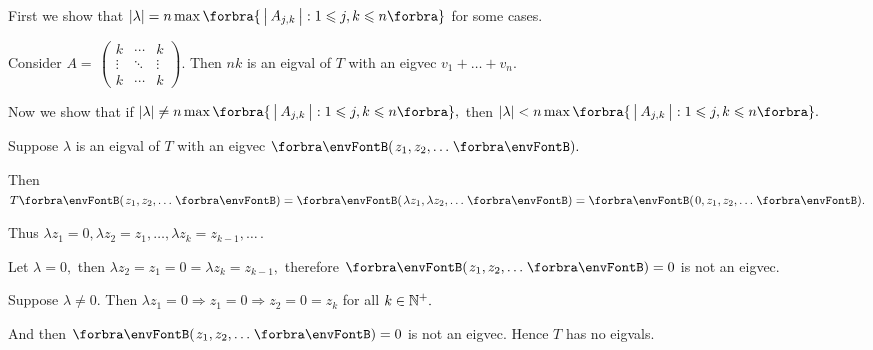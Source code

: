 \documentclass[a4paper, 11pt, UTF8]{article}
\begin{document}
\begin{large}
\par\quad
First we show that $\left|\lambda\right|=n\max\Bra{\Mid{A_{j,k}}:1\leqslant j, k\leqslant n}$ for some cases.\par\quad
Consider $A=\,${\small$\begin{pmatrix}
k & \cdots & k\\
\vdots & \ddots & \vdots\\
k & \cdots & k
\end{pmatrix}.$} Then $nk$ is an eigval of $T$ with an eigvec $v_1+\dots+v_n.$\par\quad
Now we show that if $\left|\lambda\right|\neq n\max\Bra{\Mid{A_{j,k}}:1\leqslant j, k\leqslant n},$ then $\left|\lambda\right|<n\max\Bra{\Mid{A_{j,k}}:1\leqslant j, k\leqslant n}.$\par\quad
\par
\SepLine

\par\quad
Suppose $\lambda$ is an eigval of $T$ with an eigvec $\Par{z_1,z_2,\dots}.$\par\quad
Then $T\Par{z_1,z_2,\dots}=\Par{\lambda z_1,\lambda z_2,\dots}=\Par{0,z_1,z_2,\dots}.$\par\quad
Thus $\lambda z_1=0,\lambda z_2=z_1,\dots,\lambda z_k=z_{k-1},\dots$\,.\par\quad
Let $\lambda=0,$ then $\lambda z_2=z_1=0=\lambda z_k=z_{k-1},$ therefore $\Par{z_1,z_2,\dots}=0$ is not an eigvec.\par\quad
Suppose $\lambda\neq 0$. Then $\lambda z_1=0\Rightarrow z_1=0\Rightarrow z_2=0=z_k$ for all $k\in{\mathbb{N}^+}.$\par\quad
And then $\Par{z_1,z_2,\dots}=0$ is not an eigvec.
Hence $T$ has no eigvals.\PfEnd
\par
\SepLine


\end{large}
\end{document}
